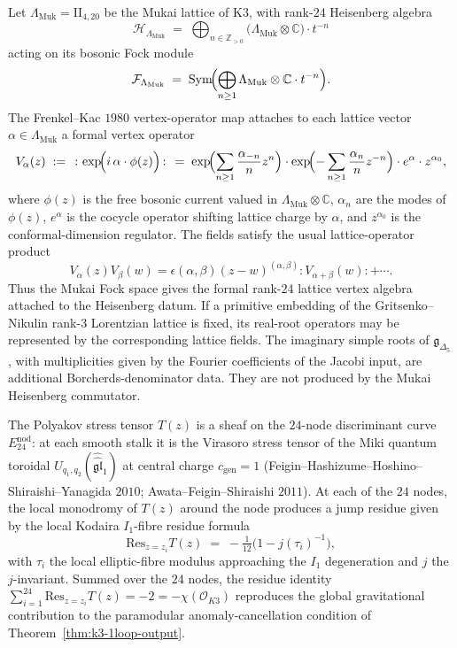 \begin{proposition}
\label{prop:k3-frenkel-kac-map}
Let $\Lambda_{\mathrm{Muk}} = \mathrm{II}_{4,20}$ be the Mukai lattice of $\mathrm{K}3$, with rank-$24$ Heisenberg algebra
\[
 \mathcal{H}_{\Lambda_{\mathrm{Muk}}}
 \;=\;
 \bigoplus_{n\in\mathbb{Z}_{>0}} \bigl(\Lambda_{\mathrm{Muk}}\otimes\mathbb{C}\bigr)\cdot t^{-n}
\]
acting on its bosonic Fock module
\[
 \mathcal{F}_{\Lambda_{\mathrm{Muk}}}
 \;=\;
 \mathrm{Sym}\!\Bigl(\bigoplus_{n\geq 1} \Lambda_{\mathrm{Muk}}\otimes\mathbb{C}\cdot t^{-n}\Bigr).
\]
The Frenkel--Kac $1980$ vertex-operator map attaches to each lattice vector $\alpha\in\Lambda_{\mathrm{Muk}}$ a formal vertex operator
\[
 V_\alpha(z)
 \;:=\;
 \,{:}\,\exp\!\Bigl(i\,\alpha\cdot\phi(z)\Bigr)\,{:}\,
 \;=\;
 \exp\!\Bigl(\sum_{n\geq 1}\frac{\alpha_{-n}}{n}z^n\Bigr)\cdot
 \exp\!\Bigl(-\sum_{n\geq 1}\frac{\alpha_n}{n}z^{-n}\Bigr)
 \cdot e^\alpha\cdot z^{\alpha_0},
\]
where $\phi(z)$ is the free bosonic current valued in $\Lambda_{\mathrm{Muk}}\otimes\mathbb{C}$, $\alpha_n$ are the modes of $\phi(z)$, $e^\alpha$ is the cocycle operator shifting lattice charge by $\alpha$, and $z^{\alpha_0}$ is the conformal-dimension regulator. The fields satisfy the usual lattice-operator product
\[
 V_\alpha(z)V_\beta(w)
 =
 \epsilon(\alpha,\beta)(z-w)^{(\alpha,\beta)}
 {:}V_{\alpha+\beta}(w){:}+\cdots .
\]
Thus the Mukai Fock space gives the formal rank-$24$ lattice vertex algebra
attached to the Heisenberg datum. If a primitive embedding of the
Gritsenko--Nikulin rank-$3$ Lorentzian lattice is fixed, its real-root
operators may be represented by the corresponding lattice fields. The
imaginary simple roots of $\mathfrak{g}_{\Delta_5}$, with multiplicities
given by the Fourier coefficients of the Jacobi input, are additional
Borcherds-denominator data. They are not produced by the Mukai
Heisenberg commutator.
\end{proposition}

\begin{remark}
\label{rem:k3-polyakov-sheaf-jump-residues}
The Polyakov stress tensor $T(z)$ is a sheaf on the $24$-node discriminant curve $E^{\mathrm{nod}}_{24}$: at each smooth stalk it is the Virasoro stress tensor of the Miki quantum toroidal $U_{q_1,q_2}(\widehat{\widehat{\mathfrak{gl}}}_1)$ at central charge $c_{\mathrm{gen}}=1$ (Feigin--Hashizume--Hoshino--Shiraishi--Yanagida $2010$; Awata--Feigin--Shiraishi $2011$). At each of the $24$ nodes, the local monodromy of $T(z)$ around the node produces a jump residue given by the local Kodaira $I_1$-fibre residue formula
\[
 \mathrm{Res}_{z=z_i} T(z)
 \;=\;
 -\tfrac{1}{12}\bigl(1-j(\tau_i)^{-1}\bigr),
\]
with $\tau_i$ the local elliptic-fibre modulus approaching the $I_1$ degeneration and $j$ the $j$-invariant. Summed over the $24$ nodes, the residue identity $\sum_{i=1}^{24} \mathrm{Res}_{z=z_i}T(z) = -2 = -\chi(\mathcal{O}_{K3})$ reproduces the global gravitational contribution to the paramodular anomaly-cancellation condition of Theorem~\ref{thm:k3-1loop-output}.
\end{remark}

